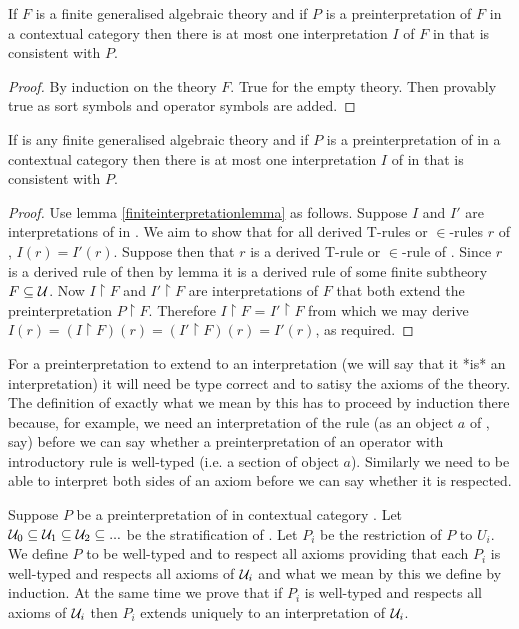 \note 
\begin{lemma}
\label{finiteinterpretationlemma}
If $F$ is a finite generalised algebraic theory and if $P$ is a preinterpretation of $F$ in a contextual category \catcw then there is at most one interpretation $I$ of $F$ in \catcw that is consistent with $P$.
\end{lemma}
\begin{proof}
By induction on the theory $F$. True for the empty theory. Then provably true as sort symbols and operator symbols are added.
\end{proof} 
\begin{lemma}
If \gatUw is any finite generalised algebraic theory and if $P$ is a preinterpretation of \gatUw in a contextual category \catcw then there is at most one interpretation $I$ of \gatUw in \catcw that is consistent with $P$.
\end{lemma}
\begin{proof}
Use lemma \ref{finiteinterpretationlemma} as follows.
Suppose $I$ and $I'$ are interpretations of \gatUw in \catc.
We aim to show that for all derived T-rules or $\in$-rules $r$ of \gatU, $I(r)=I'(r)$.
Suppose then that $r$ is a derived T-rule or $\in$-rule of \gatU. Since $r$ is a derived rule of \gatUw then by lemma  it is a derived rule of some finite subtheory $F \subseteq \mathcal{U}$. 
Now $I \restriction F$ and $I' \restriction F$ are interpretations
of $F$ that both extend the preinterpretation $P \restriction F$. Therefore $I \restriction F$ = $I' \restriction F$
from which we may derive $I(r) = (I \restriction F) (r) = (I' \restriction F)(r) = I'(r)$, as required. 
\end{proof}

\note
 For a preinterpretation to extend to an interpretation (we will say that it *is* an interpretation) 
it will need be type correct and to satisy the axioms of the theory. The definition of exactly what we mean by this has to proceed by induction there because, for example, we need an interpretation of the rule
 (as an object $a$ of \catc, say) before we can say whether a preinterpretation of an operator with introductory rule \genericfintroductoryrule
is well-typed (i.e. a section of object $a$).
Similarly we need to be able to interpret both sides of an axiom before we can say whether it is respected. 

\note Suppose $P$ be a preinterpretation of \gatUw in contextual category \catc.
Let $\mathcal{U}_0 \subseteq \mathcal{U}_1 \subseteq \mathcal{U}_2 \subseteq ...$ be the stratification of \gatU. 
Let $P_i$ be the restriction of $P$ to $U_i$. 
We define $P$ to be well-typed and to respect all axioms 
providing that  each  $P_i$ is well-typed and respects all axioms of $\mathcal{U}_i$ and 
what we mean by this we define by induction. 
At the same time we prove that if $P_i$ is well-typed and respects all axioms of $\mathcal{U}_i$ then $P_i$
extends uniquely to an interpretation of $\mathcal{U}_i$.  

